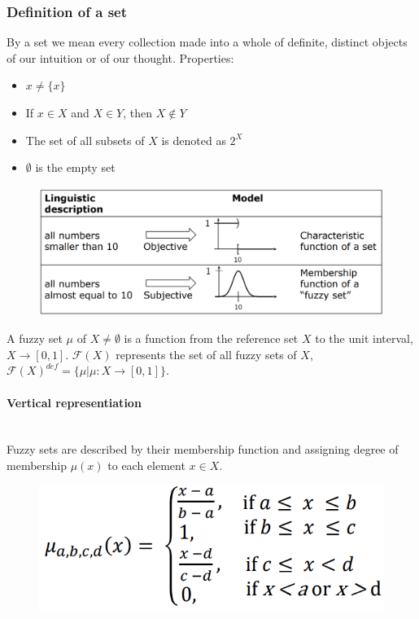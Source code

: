 \documentclass{article}
\begin{document}
\subsubsection{Definition of a set}
By a set we mean every collection made into a whole of definite, distinct objects of our intuition
or of our thought.
Properties:
\begin{itemize}
    \item $x\neq\{x\}$
    \item If $x\in X$ and $X\in Y$, then $X\notin Y$
    \item The set of all subsets of $X$ is denoted as $2^X$
    \item $\emptyset$ is the empty set
\end{itemize}
\begin{figure}[H]
    \centering
    \includegraphics[scale=0.3]{images/ext_fuzzy-set.png}
\end{figure}
A fuzzy set $\mu$ of $X\neq\emptyset$ is a function from the reference set $X$
to the unit interval, $X\rightarrow[0,1]$. $\mathcal{F}(X)$ represents the set of all fuzzy sets
of $X$, $\mathcal{F}(X)^{def}=\{\mu|\mu:X\rightarrow[0,1]\}$.
\paragraph{Vertical representiation}\mbox{}\\
Fuzzy sets are described by their membership function and assigning degree of membership $\mu(x)$
to each element $x\in X$.
\begin{figure}[H]
    \centering
    \includegraphics[scale=0.5]{images/verti-repr.png}
\end{figure}
\end{document}
